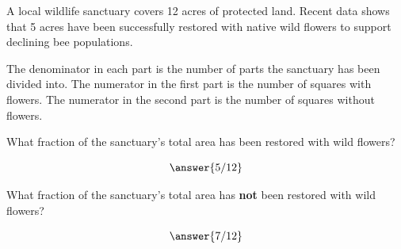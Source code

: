 \documentclass[handout, font=12pt]{ximera}
\begin{document}
\begin{problem}  A local wildlife sanctuary covers 12 acres of protected land. Recent data shows that 5 acres have been successfully restored with native wild flowers to support declining bee populations.


\begin{center}

\end{center}

\begin{hint}
The denominator in each part is the number of parts the sanctuary has been divided into.  The numerator in the first part is
the number of squares with flowers. The numerator in the second part is the number of squares without flowers.
\end{hint}

What fraction of the sanctuary's total area has been restored with wild flowers?

\[ \answer{5/12} \] 


What fraction of the sanctuary's total area has \textbf{not} been restored with wild flowers?

\[ \answer{7/12} \] 

\end{problem}
\end{document}
